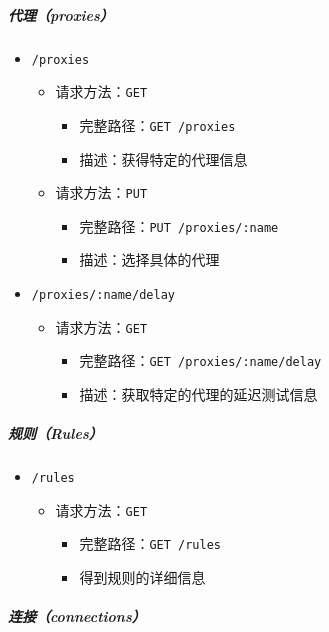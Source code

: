 \subparagraph{代理（proxies）}
\begin{itemize}
    \item \verb|/proxies|
    \begin{itemize}
        \item 请求方法：\verb|GET|
        \begin{itemize}
            \item 完整路径：\verb|GET /proxies|
            \item 描述：获得特定的代理信息
        \end{itemize}

        \item 请求方法：\verb|PUT|
        \begin{itemize}
            \item 完整路径：\verb|PUT /proxies/:name|
            \item 描述：选择具体的代理
        \end{itemize}
    \end{itemize}
    \item \verb|/proxies/:name/delay|
    \begin{itemize}
        \item 请求方法：\verb|GET|
        \begin{itemize}
            \item 完整路径：\verb|GET /proxies/:name/delay|
            \item 描述：获取特定的代理的延迟测试信息
        \end{itemize}
    \end{itemize}
\end{itemize}

\subparagraph{规则（Rules）}
\begin{itemize}
    \item \verb|/rules|
    \begin{itemize}
        \item 请求方法：\verb|GET|
        \begin{itemize}
            \item 完整路径：\verb|GET /rules|
            \item 得到规则的详细信息
        \end{itemize}
    \end{itemize}
\end{itemize}

\subparagraph{连接（connections）}

